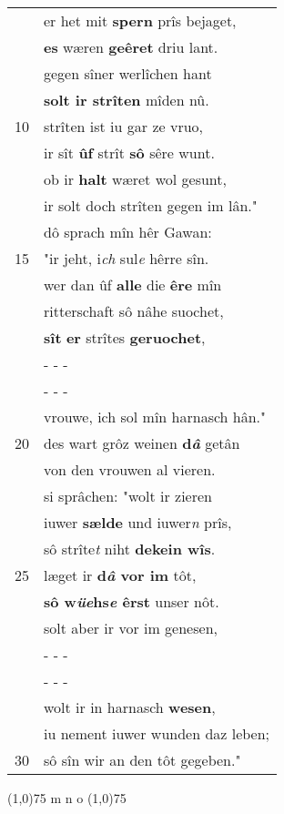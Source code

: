 \documentclass[8pt,a4paper,notitlepage]{article}
\begin{document}
\begin{table}[ht]
\begin{minipage}[t]{0.5\linewidth}
\begin{tabular}{rl}
 & er het mit \textbf{spern} prîs bejaget,\\ 
 & \textbf{es} wæren \textbf{geêret} driu lant.\\ 
 & gegen sîner werlîchen hant\\ 
 & \textbf{solt ir strîten} mîden nû.\\ 
10 & strîten ist iu gar ze vruo,\\ 
 & ir sît \textbf{ûf} strît \textbf{sô} sêre wunt.\\ 
 & ob ir \textbf{halt} wæret wol gesunt,\\ 
 & ir solt doch strîten gegen im lân."\\ 
 & dô sprach mîn hêr Gawan:\\ 
15 & "ir jeht, i\textit{ch} sul\textit{e} hêrre sîn.\\ 
 & wer dan ûf \textbf{alle} die \textbf{êre} mîn\\ 
 & ritterschaft sô nâhe suochet,\\ 
 & \textbf{sît} \textbf{er} strîtes \textbf{geruochet},\\ 
 & \multicolumn{1}{l}{ - - - }\\ 
 & \multicolumn{1}{l}{ - - - }\\ 
 & vrouwe, ich sol mîn harnasch hân."\\ 
20 & des wart grôz weinen \textbf{d\textit{â}} getân\\ 
 & von den vrouwen al vieren.\\ 
 & si sprâchen: "wolt ir zieren\\ 
 & iuwer \textbf{sælde} und iuwer\textit{n} prîs,\\ 
 & sô strîte\textit{t} niht \textbf{dekein wîs}.\\ 
25 & læget ir \textbf{d\textit{â} vor im} tôt,\\ 
 & \textbf{sô w\textit{üe}hs\textit{e} êrst} unser nôt.\\ 
 & solt aber ir vor im genesen,\\ 
 & \multicolumn{1}{l}{ - - - }\\ 
 & \multicolumn{1}{l}{ - - - }\\ 
 & wolt ir in harnasch \textbf{wesen},\\ 
 & iu nement iuwer wunden daz leben;\\ 
30 & sô sîn wir an den tôt gegeben."\\ 
\end{tabular}
\scriptsize
\line(1,0){75} \newline
m n o \newline
\line(1,0){75} \newline

\end{minipage}
\end{table}
\end{document}

